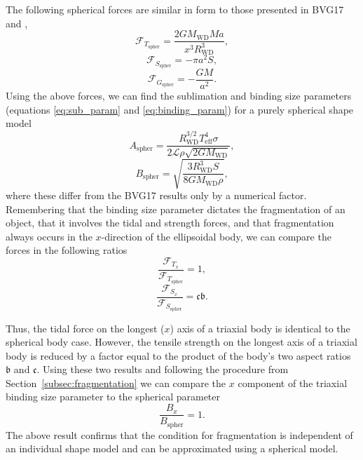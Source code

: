 \documentclass[fleqn,usenatbib]{mnras}
\begin{document}
The following spherical forces are similar in form to those presented in BVG17 and \cite{BearSoker2015},
\begin{equation}
    \label{eq:spher_tidal}
    \mathcal{F}_{T_\text{spher}} = \frac{2 G M_\text{WD} M a}{x^3 R_\text{WD}^3},
\end{equation}
\begin{equation}
    \label{eq:spher_strength}
    \mathcal{F}_{S_\text{spher}} = - \pi a^2 S,
\end{equation}
\begin{equation}
    \label{eq:spher_grav}
    \mathcal{F}_{{G}_\text{spher}} = - \frac{G M}{a^2}.
\end{equation}
Using the above forces, we can find the sublimation and binding size parameters (equations \ref{eq:sub_param} and \ref{eq:binding_param}) for a purely spherical shape model
\begin{equation}
    \label{eq:subparam_spher}
    A_\text{spher} = \frac{R_\text{WD}^{3/2} T_\text{eff}^4 \sigma}{2 \mathcal{L} \rho \sqrt{2GM_\text{WD}}},
\end{equation}
\begin{equation}
    \label{eq:bindparam_spher}
    B_\text{spher} = \sqrt{\frac{3 R_\text{WD}^3 S}{8 G M_\text{WD} \rho}},
\end{equation}
where these differ from the BVG17 results only by a numerical factor. 
Remembering that the binding size parameter dictates the fragmentation of an object, that it involves the tidal and strength forces, and that fragmentation always occurs in the $x$-direction of the ellipsoidal body, we can compare the forces in the following ratios
\begin{equation}
    \label{eq:spher_tri_compar_tidal}
    \frac{\mathcal{F}_{T_x}}{\mathcal{F}_{T_\text{spher}}} = 1,
\end{equation}
\begin{equation}
    \label{eq:spher_tri_compar_strength}
    \frac{\mathcal{F}_{S_x}}{\mathcal{F}_{S_\text{spher}}} = \mathfrak{c}\mathfrak{b}. 
\end{equation}

Thus, the tidal force on the longest ($x$) axis of a triaxial body is identical to the spherical body case. 
However, the tensile strength on the longest axis of a triaxial body is reduced by a factor equal to the product of the body's two aspect ratios $\mathfrak{b}$ and $\mathfrak{c}$.
Using these two results and following the procedure from Section~\ref{subsec:fragmentation} we can compare the $x$ component of the triaxial binding size parameter to the spherical parameter
\begin{equation}
    \label{eq:spher_tri_compar_binding}
    \frac{B_x}{B_\text{spher}} = 1.
\end{equation}
The above result confirms that the condition for fragmentation is independent of an individual shape model and can be approximated using a spherical model.
\end{document}
